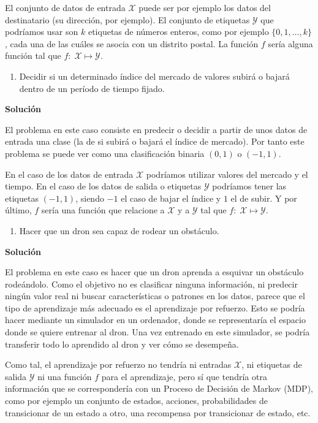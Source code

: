 \documentclass[11pt,a4paper]{article}
\newcommand{\answer}{\noindent\textbf{Solución}}
\begin{document}
El conjunto de datos de entrada $\mathcal{X}$ puede ser por ejemplo los datos del destinatario (su dirección, por ejemplo). El
conjunto de etiquetas $\mathcal{Y}$ que podríamos usar son $k$ etiquetas de números enteros, como por ejemplo $\lbrace 0, 1,
\dots , k \rbrace$, cada una de las cuáles se asocia con un distrito postal. La función $f$ sería alguna función tal que $f:
\; \mathcal{X} \mapsto \mathcal{Y}$.

\begin{enumerate}[resume,label=\textit{\alph*})]
	\item Decidir si un determinado índice del mercado de valores subirá o bajará dentro de un período de tiempo fijado.
\end{enumerate}

\answer

El problema en este caso consiste en predecir o decidir a partir de unos datos de entrada una clase (la de si subirá o bajará
el índice de mercado). Por tanto este problema se puede ver como una clasificación binaria $(0, 1)$ o $(-1, 1)$.

En el caso de los datos de entrada $\mathcal{X}$ podríamos utilizar valores del mercado y el tiempo. En el caso de los datos
de salida o etiquetas $\mathcal{Y}$ podríamos tener las etiquetas $(-1, 1)$, siendo $-1$ el caso de bajar el índice y $1$ el
de subir. Y por último, $f$ sería una función que relacione a $\mathcal{X}$ y a $\mathcal{Y}$ tal que $f: \; \mathcal{X}
\mapsto \mathcal{Y}$.

\begin{enumerate}[resume,label=\textit{\alph*})]
	\item Hacer que un dron sea capaz de rodear un obstáculo.
\end{enumerate}

\answer

El problema en este caso es hacer que un dron aprenda a esquivar un obstáculo rodeándolo. Como el objetivo no es clasificar
ninguna información, ni predecir ningún valor real ni buscar características o patrones en los datos, parece que el tipo
de aprendizaje más adecuado es el aprendizaje por refuerzo. Esto se podría hacer mediante un simulador en un ordenador, donde
se representaría el espacio donde se quiere entrenar al dron. Una vez entrenado en este simulador, se podría transferir todo
lo aprendido al dron y ver cómo se desempeña.

Como tal, el aprendizaje por refuerzo no tendría ni entradas $\mathcal{X}$, ni etiquetas de salida $\mathcal{Y}$ ni una
función $f$ para el aprendizaje, pero sí que tendría otra información que se correspondería con un Proceso de Decisión de
Markov (MDP), como por ejemplo un conjunto de estados, acciones, probabilidades de transicionar de un estado a otro, una
recompensa por transicionar de estado, etc.
\end{document}
